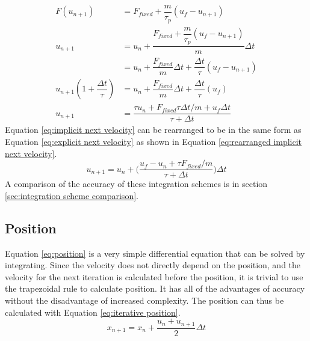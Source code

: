 \documentclass[a4paper,11pt,titlepage]{report}
\begin{document}
\begin{align}
F(u_{n+1}) &= F_{fixed} + \dfrac{m}{\tau_p}(u_f - u_{n+1}) \nonumber \\
u_{n+1} &= u_n + \dfrac{F_{fixed} + \dfrac{m}{\tau_p}(u_f - u_{n+1})}{m}\Delta t \nonumber \\
&= u_n + \dfrac{F_{fixed}}{m}\Delta t + \dfrac{\Delta t}{\tau}(u_f - u_{n+1}) \nonumber \\
u_{n+1} (1 + \dfrac{\Delta t}{\tau}) &= u_n + \dfrac{F_{fixed}}{m}\Delta t + \dfrac{\Delta t}{\tau}(u_f) \nonumber \\
u_{n+1} &= \dfrac{\tau u_n + F_{fixed} \tau \Delta t / m + u_f \Delta t}{\tau + \Delta t} \label{eq:implicit next velocity}
\end{align}
Equation \ref{eq:implicit next velocity} can be rearranged to be in the same form as Equation \ref{eq:explicit next velocity} as shown in Equation \ref{eq:rearranged implicit next velocity}.
\begin{equation}
u_{n+1} = u_n + \Big(\dfrac{u_f - u_n + \tau F_{fixed} / m}{\tau + \Delta t}\Big)\Delta t
\label{eq:rearranged implicit next velocity}
\end{equation}
A comparison of the accuracy of these integration schemes is in section \ref{sec:integration scheme comparison}.
\subsection{Position}
Equation \ref{eq:position} is a very simple differential equation that can be solved by integrating. Since the velocity does not directly depend on the position, and the velocity for the next iteration is calculated before the position, it is trivial to use the trapezoidal rule to calculate position. It has all of the advantages of accuracy without the disadvantage of increased complexity. The position can thus be calculated with Equation \ref{eq:iterative position}.
\begin{equation}
x_{n+1} = x_n + \dfrac{u_n + u_{n+1}}{2}\Delta t
\label{eq:iterative position}
\end{equation}
\end{document}
